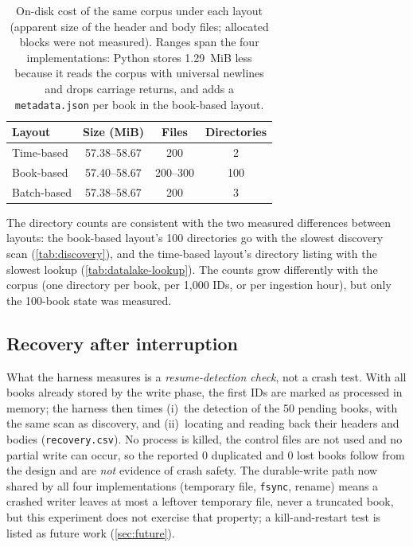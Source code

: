 \begin{table}[htbp]
    \centering
    \caption{On-disk cost of the same corpus under each layout (apparent
    size of the header and body files; allocated blocks were not measured).
    Ranges span the four implementations: Python stores 1.29~MiB less
    because it reads the corpus with universal newlines and drops carriage
    returns, and adds a \texttt{metadata.json} per book in the book-based
    layout.}
    \label{tab:datalake-storage}
    \begin{tabular}{@{}lccc@{}}
        \toprule
        Layout & Size (MiB) & Files & Directories \\
        \midrule
        Time-based & 57.38--58.67 & 200 & 2 \\
        Book-based & 57.40--58.67 & 200--300 & 100 \\
        Batch-based & 57.38--58.67 & 200 & 3 \\
        \bottomrule
    \end{tabular}
\end{table}

The directory counts are consistent with the two measured differences
between layouts: the book-based layout's 100 directories go with the slowest
discovery scan (\cref{tab:discovery}), and the time-based layout's directory
listing with the slowest lookup (\cref{tab:datalake-lookup}). The counts grow
differently with the corpus (one directory per book, per 1{,}000 IDs, or per
ingestion hour), but only the 100-book state was measured.

\subsection{Recovery after interruption}
\label{sec:datalake-recovery}

What the harness measures is a \emph{resume-detection check}, not a crash
test. With all  books already stored by the write phase, the first
 IDs are marked as processed in memory; the harness then times
(i)~the detection of the 50 pending books, with the same scan as discovery,
and (ii)~locating and reading back their headers and bodies
(\texttt{recovery.csv}). No process is killed, the control files are not
used and no partial write can occur, so the reported 0 duplicated and 0 lost
books follow from the design and are \emph{not} evidence of crash safety.
The durable-write path now shared by all four implementations (temporary
file, \texttt{fsync}, rename) means a crashed writer leaves at most a
leftover temporary file, never a truncated book, but this experiment does
not exercise that property; a kill-and-restart test is listed as future work
(\cref{sec:future}).

